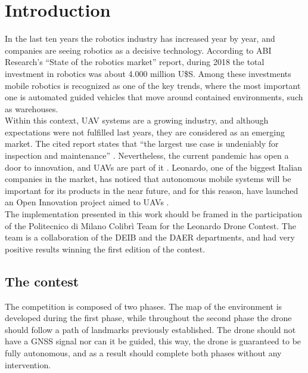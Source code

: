 \cleardoublepage
\chapter{Introduction}
\label{ch:chapter0:intro}
In the last ten years the robotics industry has increased year by year, and companies are seeing robotics as a decisive technology. According to ABI Research's \cite{abi-report} \enquote{State of the robotics market} report, during 2018 the total investment in robotics was about 4.000 million U\$S. Among these investments mobile robotics is recognized as one of the key trends, where the most important one is automated guided vehicles that move around contained environments, such as warehouses. \\

Within this context, \ac{UAV} systems are a growing industry, and although expectations were not fulfilled last years, they are considered as an emerging market. The cited report states that \enquote{the largest use case is undeniably for inspection and maintenance} \cite{abi-report}. Nevertheless, the current pandemic has open a door to innovation, and \ac{UAV}s are part of it \cite{eu-robotics-covid}. Leonardo, one of the biggest Italian companies in the market, has noticed that autonomous mobile systems will be important for its products in the near future, and for this reason, have launched an Open Innovation project aimed to \ac{UAV}s \cite{leonardo-drone-contest}.\\

The implementation presented in this work should be framed in the participation of the Politecnico di Milano Colibrì Team for the Leonardo Drone Contest. The team is a collaboration of the DEIB and the DAER departments, and had very positive results winning the first edition of the contest. %
\section*{The contest}
The competition is composed of two phases. The map of the environment is developed during the first phase, while throughout the second phase the drone should follow a path of landmarks previously established. The drone should not have a GNSS signal nor can it be guided, this way, the drone is guaranteed to be fully autonomous, and as a result should complete both phases without any intervention.\\


